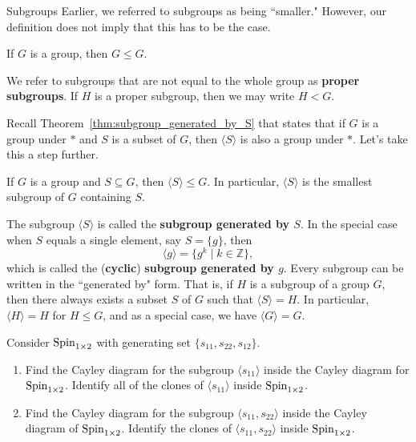 \begin{section}{Subgroups}
Earlier, we referred to subgroups as being ``smaller."  However, our definition does not imply that this has to be the case.

\begin{theorem}\label{thm:improper_subgroup}
If $G$ is a group, then $G\leq G$.
\end{theorem}

We refer to subgroups that are not equal to the whole group as \textbf{proper subgroups}. If $H$ is a proper subgroup, then we may write $H<G$.

Recall Theorem~\ref{thm:subgroup_generated_by_S} that states that if $G$ is a group under $*$ and $S$ is a subset of $G$, then $\langle S\rangle$ is also a group under $*$.  Let's take this a step further.

\begin{theorem}\label{thm:smallest_subgroup_containing_S}
If $G$ is a group and $S\subseteq G$, then $\langle S\rangle \leq G$.  In particular, $\langle S\rangle$ is the smallest subgroup of $G$ containing $S$.
\end{theorem}

The subgroup $\langle S\rangle$ is called the \textbf{subgroup generated by $S$}.  In the special case when $S$ equals a single element, say $S=\{g\}$, then
\[
\langle g\rangle =\{g^k\mid k\in\mathbb{Z}\},
\]
which is called the (\textbf{cyclic}) \textbf{subgroup generated by $g$}. Every subgroup can be written in the ``generated by" form.  That is, if $H$ is a subgroup of a group $G$, then there always exists a subset $S$ of $G$ such that $\langle S\rangle=H$.  In particular, $\langle H\rangle=H$ for $H\leq G$, and as a special case, we have $\langle G\rangle=G$.

\begin{problem}
Consider $\operatorname{Spin}_{1\times 2}$ with generating set $\{s_{11}, s_{22},s_{12}\}$.  
\begin{enumerate}[label=\rm{(\alph*)}]
\item Find the Cayley diagram for the subgroup $\langle s_{11}\rangle$ inside the Cayley diagram for $\operatorname{Spin}_{1\times 2}$.  Identify all of the clones of $\langle s_{11}\rangle$ inside $\operatorname{Spin}_{1\times 2}$.
\item Find the Cayley diagram for the subgroup $\langle s_{11}, s_{22}\rangle$ inside the Cayley diagram of $\operatorname{Spin}_{1\times 2}$.  Identify the clones of $\langle s_{11}, s_{22}\rangle$ inside $\operatorname{Spin}_{1\times 2}$.
\end{enumerate}
\end{problem}


\end{section}
